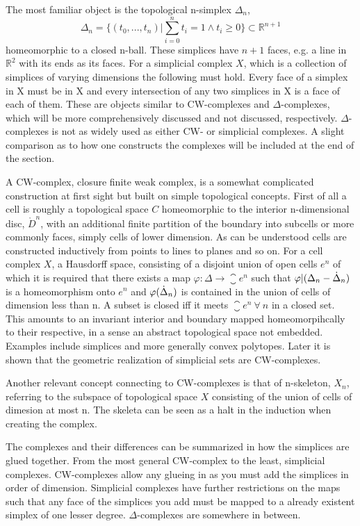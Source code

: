 \documentclass[../../main.tex]{subfiles}
\begin{document}
    The most familiar object is the topological n-simplex $\Delta_n$,
    \begin{equation}
        \Delta_n = \{(t_0, . . . , t_n)  |\sum_{i=0}^{n}t_i=1 \wedge t_i \geq 0\} \subset \mathbb{R}^{n+1}
    \end{equation}
    homeomorphic to a closed n-ball. These simplices have $n+1$ faces, e.g. a line in $\mathbb{R}^2$ with its ends as its faces. For a simplicial complex $X$, which is a collection of simplices of varying dimensions the following must hold. Every face of a simplex in X must be in X and every intersection of any two simplices in X is a face of each of them. These are objects similar to CW-complexes and $\Delta$-complexes, which will be more comprehensively discussed and not discussed, respectively. $\Delta$-complexes is not as widely used as either CW- or simplicial complexes. A slight comparison as to how one constructs the complexes will be included at the end of the section. 
    
    A CW-complex, closure finite weak complex, is a somewhat complicated construction at first sight but built on simple topological concepts. First of all a cell is roughly a topological space $C$ homeomorphic to the interior n-dimensional disc, $\mathring{D}^n$, with an additional finite partition of the boundary into subcells or more commonly faces, simply cells of lower dimension. As can be understood cells are constructed inductively from points to lines to planes and so on. For a cell complex $X$, a Hausdorff space, consisting of a disjoint union of open cells $e^n$ of which it is required that there exists a map $\varphi:\Delta\to\closure{e}^n$ such that $\varphi|(\Delta_n - \dot{\Delta}_n )$ is a homeomorphism onto $e^n$ and $\varphi(\dot{\Delta}_n)$ is contained in the union of cells of dimension less than n. A subset is closed iff it meets $\closure{e}^n\:\forall \:n$ in a closed set. This amounts to an invariant interior and boundary mapped homeomorpihcally to their respective, in a sense an abstract topological space not embedded. Examples include simplices and more generally convex polytopes. Later it is shown that the geometric realization of simplicial sets are CW-complexes.
    
    Another relevant concept connecting to CW-complexes is that of n-skeleton, $X_n$, referring to the subspace of topological space $X$ consisting of the union of cells of dimesion at most n. The skeleta can be seen as a halt in the induction when creating the complex. 

    The complexes and their differences can be summarized in how the simplices are glued together. From the most general CW-complex to the least, simplicial complexes. CW-complexes allow any glueing in as you must add the simplices in order of dimension. Simplicial complexes have further restrictions on the maps such that any face of the simplices you add must be mapped to a already existent simplex of one lesser degree. $\Delta$-complexes are somewhere in between.
    
    
\end{document}
